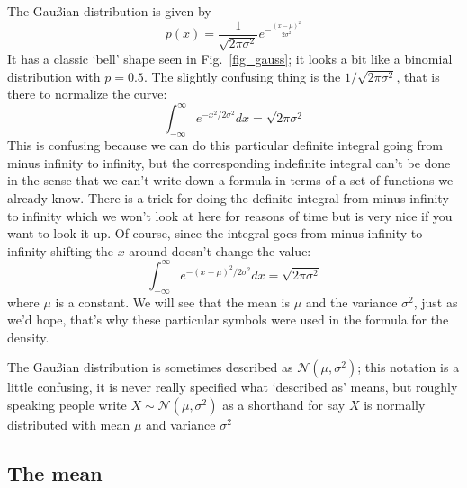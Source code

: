 \documentclass[11pt,a4paper]{scrartcl}
\begin{document}
The Gau\ss{}ian distribution is given by
\begin{equation}
p(x)=\frac{1}{\sqrt{2\pi\sigma^2}}e^{-\frac{(x-\mu)^2}{2\sigma^2}}
\end{equation}
It has a classic \lq{}bell\rq{} shape seen in Fig.~\ref{fig_gauss}; it
looks a bit like a binomial distribution with $p=0.5$. The slightly
confusing thing is the $1/\sqrt{2\pi\sigma^2}$, that is there to normalize the curve:
\begin{equation}
\int_{-\infty}^\infty e^{-x^2/2\sigma^2}dx=\sqrt{2\pi\sigma^2}
\end{equation}
This is confusing because we can do this particular definite integral
going from minus infinity to infinity, but the corresponding
indefinite integral can't be done in the sense that we can't write
down a formula in terms of a set of functions we already know. There is a trick
for doing the definite integral from minus infinity to infinity which
we won't look at here for reasons of time but is very nice if you want
to look it up. Of course, since the integral goes from minus infinity
to infinity shifting the $x$ around doesn't change the value:
\begin{equation}
\int_{-\infty}^\infty e^{-(x-\mu)^2/2\sigma^2}dx=\sqrt{2\pi\sigma^2}
\end{equation}
where $\mu$ is a constant. We will see that the mean is $\mu$ and the variance
$\sigma^2$, just as we'd hope, that's why these particular symbols
were used in the formula for the density.

The Gau\ss{}ian distribution is sometimes described as
$\mathcal{N}(\mu,\sigma^2)$; this notation is a little confusing, it is never
really specified what \lq{}described as\rq{} means, but roughly
speaking people write $X\sim \mathcal{N}(\mu,\sigma^2)$ as a shorthand for say
$X$ is normally distributed with mean $\mu$ and variance $\sigma^2$

\subsection*{The mean}
\end{document}
